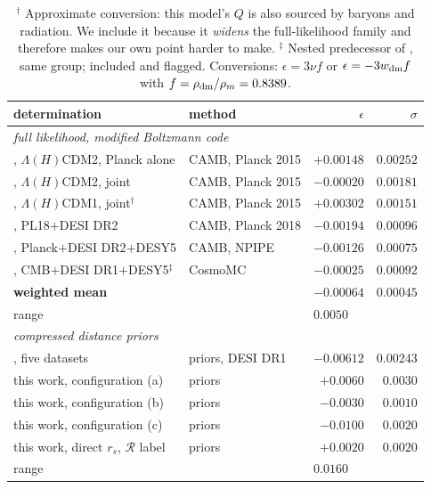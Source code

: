 \documentclass[11pt,a4paper]{article}
\begin{document}
\begin{table}[t]
\centering
\begin{tabular}{llrr}
\toprule
determination & method & $\epsilon$ & $\sigma$ \\
\midrule
\multicolumn{4}{l}{\emph{full likelihood, modified Boltzmann code}}\\
\citet{tsiapi2019}, $\Lambda(H)$CDM2, Planck alone & CAMB, Planck 2015 & $+0.00148$ & $0.00252$\\
\citet{tsiapi2019}, $\Lambda(H)$CDM2, joint        & CAMB, Planck 2015 & $-0.00020$ & $0.00181$\\
\citet{tsiapi2019}, $\Lambda(H)$CDM1, joint$^\dagger$ & CAMB, Planck 2015 & $+0.00302$ & $0.00151$\\
\citet{kumar2025}, PL18$+$DESI DR2                 & CAMB, Planck 2018 & $-0.00194$ & $0.00096$\\
\citet{li2025}, Planck$+$DESI DR2$+$DESY5          & CAMB, NPIPE       & $-0.00126$ & $0.00075$\\
\citet{li2024}, CMB$+$DESI DR1$+$DESY5$^\ddagger$  & CosmoMC           & $-0.00025$ & $0.00092$\\
\midrule
\multicolumn{2}{l}{\textbf{weighted mean}} & $\mathbf{-0.00064}$ & $\mathbf{0.00045}$\\
\multicolumn{2}{l}{range} & \multicolumn{2}{l}{$0.0050$}\\
\midrule
\multicolumn{4}{l}{\emph{compressed distance priors}}\\
\citet{yang2025}, five datasets                    & priors, DESI DR1 & $-0.00612$ & $0.00243$\\
this work, configuration (a)                       & priors           & $+0.0060$ & $0.0030$\\
this work, configuration (b)                       & priors           & $-0.0030$ & $0.0010$\\
this work, configuration (c)                       & priors           & $-0.0100$ & $0.0020$\\
this work, direct $r_s$, $\mathcal{R}$ label       & priors           & $+0.0020$ & $0.0020$\\
\midrule
\multicolumn{2}{l}{range} & \multicolumn{2}{l}{$\mathbf{0.0160}$}\\
\bottomrule
\end{tabular}
\caption{$^\dagger$ Approximate conversion: this model's $Q$ is also sourced by baryons and
radiation. We include it because it \emph{widens} the full-likelihood family and therefore
makes our own point harder to make. $^\ddagger$ Nested predecessor of \citet{li2025}, same
group; included and flagged. Conversions: $\epsilon=3\nu f$ or $\epsilon=-3w_{\rm dm}f$ with
$f=\rho_{\rm dm}/\rho_m=0.8389$.}
\label{tab:litterature}
\end{table}
\end{document}
